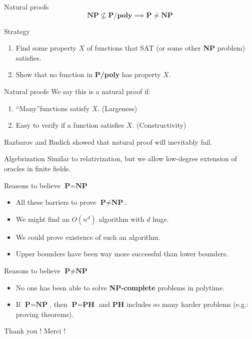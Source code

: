 \documentclass{beamer} %
\theoremstyle{definition}
\theoremstyle{remark}
\begin{document}
\begin{frame}{Natural proofs}
	\[\textbf{NP} \not\subseteq \textbf{P/poly} \implies \textbf{P} \neq \textbf{NP}\]
	
	\pause
	\begin{block}{Strategy}
		\pause
		\begin{enumerate}
			\item Find some property $X$ of functions that SAT (or some other \textbf{NP} problem) satisfies.
			\pause
			\item Show that no function in \textbf{P/poly} has property $X$.
		\end{enumerate}
	\end{block}
\end{frame}
\begin{frame}{Natural proofs}
	We say this is a natural proof if:
	\begin{enumerate}
		\pause
		\item \textquotedblleft Many\textquotedblright functions satisfy $X$. (Largeness)
		\pause
		\item Easy to verify if a function satisfies $X$. (Constructivity)
	\end{enumerate}
	
	\pause \vspace{10pt}
	Razbarov and Rudich showed that natural proof will inevitably fail.
\end{frame}
\begin{frame}{Algebrization}
	Similar to relativization, but we allow low-degree extension of oracles in finite fields.
\end{frame}
\begin{frame}{Reasons to believe $\textbf{P} = \textbf{NP}$}
	\begin{itemize}
		\pause
		\item All these barriers to prove $\textbf{P} \neq \textbf{NP}$.
		\pause
		\item We might find an $O(n^d)$ algorithm with $d$ huge.
		\pause
		\item We could prove existence of such an algorithm.
		\pause
		\item Upper bounders have been way more successful than lower bounders.
	\end{itemize}
\end{frame}
\begin{frame}{Reasons to believe $\textbf{P} \neq \textbf{NP}$}
	\begin{itemize}
		\pause
		\item No one has been able to solve \textbf{NP-complete} problems in polytime.
		\pause
		\item If $\textbf{P} = \textbf{NP}$, then $\textbf{P} = \textbf{PH}$ and \textbf{PH} includes so many harder problems (e.g.: proving theorems).
	\end{itemize}
\end{frame}

\begin{frame}{Thank you !}
	Merci !
\end{frame}
\end{document}
